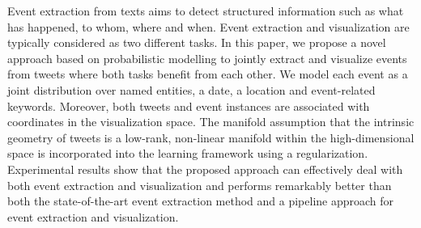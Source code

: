 Event extraction from texts aims to detect structured information such as what has happened, to whom, where and when. Event extraction and visualization are typically considered as two different tasks. In this paper, we propose a novel approach based on probabilistic modelling to jointly extract and visualize events from tweets where both tasks benefit from each other. We model each event as a joint distribution over named entities, a date, a location and event-related keywords. Moreover, both tweets and event instances are associated with coordinates in the visualization space. The manifold assumption that the intrinsic geometry of tweets is a low-rank, non-linear manifold within the high-dimensional space is incorporated into the learning framework using a regularization. Experimental results show that the proposed approach can effectively deal with both event extraction and visualization and performs remarkably better than both the state-of-the-art event extraction method and a pipeline approach for event extraction and visualization.
